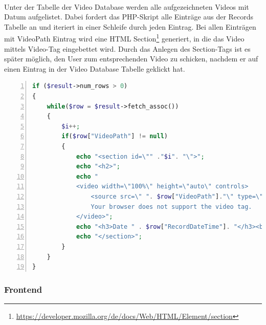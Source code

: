 \\
Unter der Tabelle der Video Database werden alle aufgezeichneten Videos mit Datum aufgelistet. Dabei fordert das PHP-Skript alle Eintr\"age aus der Records Tabelle an und iteriert in einer Schleife durch jeden Eintrag. Bei allen Eintr\"agen mit VideoPath Eintrag wird eine HTML Section\footnote{\hyperlink{https://developer.mozilla.org/de/docs/Web/HTML/Element/section}{https://developer.mozilla.org/de/docs/Web/HTML/Element/section}} generiert, in die das Video mittels Video-Tag eingebettet wird. Durch das Anlegen des Section-Tags ist es sp\"ater m\"oglich, den User zum entsprechenden Video zu schicken, nachdem er auf einen Eintrag in der Video Database Tabelle geklickt hat.\\


\begin{lstlisting}[language=PHP,caption={Auszug aus dem PHP-Skript (Videos auflisten)},numbers=left,frame=lrbt]
if ($result->num_rows > 0) 
{
    while($row = $result->fetch_assoc()) 
    {
        $i++;
		if($row["VideoPath"] != null)
		{	
			echo "<section id=\"" ."$i". "\">";			
			echo "<h2>";
			echo "
            <video width=\"100%\" height=\"auto\" controls>
                <source src=\" ". $row["VideoPath"]."\" type=\"video/mp4\">
                Your browser does not support the video tag.
            </video>";	
			echo "<h3>Date " . $row["RecordDateTime"]. "</h3><br><br>";		
			echo "</section>";
		}
    }
} 
\end{lstlisting}

\subsubsection{Frontend}

